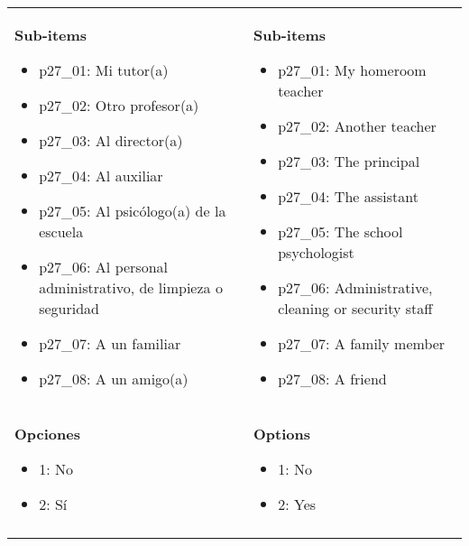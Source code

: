 \documentclass[11pt]{article}
\begin{document}
\begin{longtable}{@{}LL@{}}
\textbf{Sub-items}\par\begin{itemize}[leftmargin=*]\item p27\_01: Mi tutor(a)
\item p27\_02: Otro profesor(a)
\item p27\_03: Al director(a)
\item p27\_04: Al auxiliar
\item p27\_05: Al psicólogo(a) de la escuela
\item p27\_06: Al personal administrativo, de limpieza o seguridad
\item p27\_07: A un familiar
\item p27\_08: A un amigo(a)\end{itemize} & \textbf{Sub-items}\par\begin{itemize}[leftmargin=*]\item p27\_01: My homeroom teacher
\item p27\_02: Another teacher
\item p27\_03: The principal
\item p27\_04: The assistant
\item p27\_05: The school psychologist
\item p27\_06: Administrative, cleaning or security staff
\item p27\_07: A family member
\item p27\_08: A friend\end{itemize} \\
\textbf{Opciones}\par\begin{itemize}[leftmargin=*]\item 1: No
\item 2: Sí\end{itemize} & \textbf{Options}\par\begin{itemize}[leftmargin=*]\item 1: No
\item 2: Yes\end{itemize} \\
\addlinespace[4pt]
\end{longtable}
\end{document}
